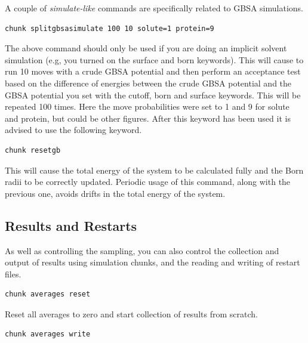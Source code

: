 \documentclass[letterpaper,10pt,english]{sphinxmanual}
\begin{document}
A couple of \emph{simulate-like} commands are specifically related to GBSA simulations.

\begin{Verbatim}[frame=single,commandchars=\\\{\}]
chunk splitgbsasimulate 100 10 solute=1 protein=9
\end{Verbatim}

The above command should only be used if you are doing an implicit solvent simulation (e.g, you turned on the surface and born keywords). This will cause to run 10 moves with a crude GBSA potential and then perform an acceptance test based on the difference of energies between the crude GBSA potential and the GBSA potential you set with the cutoff, born and surface keywords. This will be repeated 100 times. Here the move probabilities were set to 1 and 9 for solute and protein, but could be other figures. After this keyword has been used it is advised to use the following keyword.

\begin{Verbatim}[frame=single,commandchars=\\\{\}]
chunk resetgb
\end{Verbatim}

This will cause the total energy of the system to be calculated fully and the Born radii to be correctly updated. Periodic usage of this command, along with the previous one, avoids drifts in the total energy of the system.


\subsection{Results and Restarts}
\label{protoms:results-and-restarts}
As well as controlling the sampling, you can also control the collection and output of results using simulation chunks, and the reading and writing of restart files.

\begin{Verbatim}[frame=single,commandchars=\\\{\}]
chunk averages reset
\end{Verbatim}

Reset all averages to zero and start collection of results from scratch.

\begin{Verbatim}[frame=single,commandchars=\\\{\}]
chunk averages write
\end{Verbatim}
\end{document}
